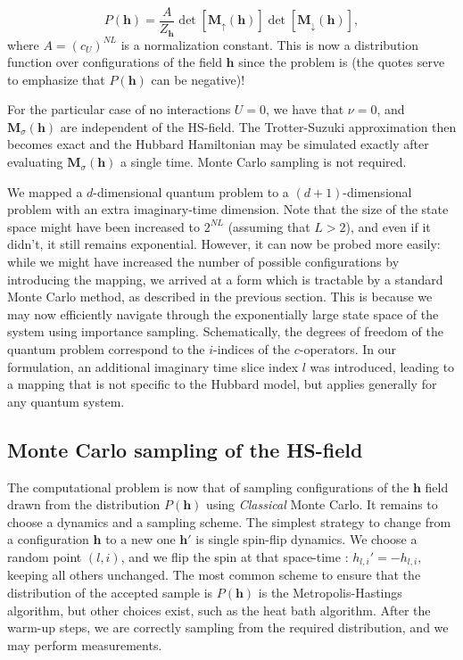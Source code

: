\begin{equation}
P(\bm h) = \frac{A}{Z_{\bm h}} \det [ \bm M_{\uparrow}(\bm h) ] \det [ \bm M_{\downarrow}(\bm h) ] ,
\end{equation}
where $A = (c_U)^{NL}$ is a normalization constant.
This is now a distribution function over configurations of the field $\bm h$ since the problem is  (the quotes serve to emphasize that $P (\bm h )$ can be negative)!

For the particular case of no interactions $U = 0$, we have that $\nu = 0$, and $\bm M_\sigma (\bm h)$ are independent of the HS-field. 
The Trotter-Suzuki approximation then becomes exact and the Hubbard Hamiltonian may be simulated exactly after evaluating $\bm M_\sigma (\bm h)$ a single time.
Monte Carlo sampling is not required.

We mapped a $d$-dimensional quantum problem to a $(d+1)$-dimensional  problem with an extra imaginary-time dimension.
Note that the size of the state space might have been increased to $2^{NL}$ (assuming that $L > 2$), and even if it didn't, it still remains exponential.
However, it can now be probed more easily: while we might have increased the number of possible configurations by introducing the mapping, we arrived at a form which is tractable by a standard Monte Carlo method, as described in the previous section.
This is because we may now efficiently navigate through the exponentially large state space of the system using importance sampling.
Schematically, the degrees of freedom of the quantum problem correspond to the $i$-indices of the $c$-operators.
In our formulation, an additional imaginary time slice index $l$ was introduced, leading to a mapping that is not specific to the Hubbard model, but applies generally for any quantum system.

\subsection{Monte Carlo sampling of the HS-field}
\label{subsec:mc_hs}

The computational problem is now that of sampling configurations of the $\bm h$ field drawn from the distribution $P(\bm h)$ using \emph{Classical} Monte Carlo.
It remains to choose a dynamics and a sampling scheme. The simplest strategy to change from a configuration $\bm h$ to a new one $\bm h'$ is single spin-flip dynamics. We choose a random point $(l, i)$, and we flip the spin at that space-time  :
$
h_{l, i}' = - h_{l, i},
$
keeping all others unchanged.
The most common scheme to ensure that the distribution of the accepted sample is $P(\bm h)$ is the Metropolis-Hastings algorithm, but other choices exist, such as the heat bath algorithm.
After the warm-up steps, we are correctly sampling from the required distribution, and we may perform measurements.

